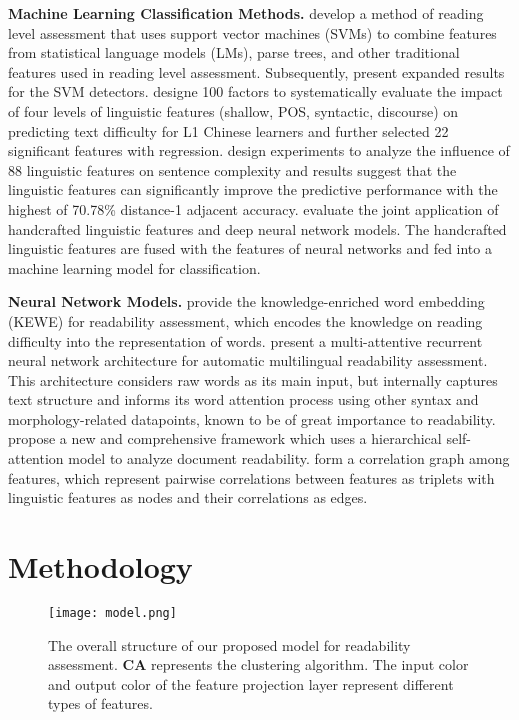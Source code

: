 \documentclass[11pt]{article}
\begin{document}
\noindent\textbf{Machine Learning Classification Methods.}
\cite{schwarm2005reading} develop a method of reading level assessment that uses support vector machines (SVMs) to combine features from statistical language models (LMs), parse trees, and other traditional features used in reading level assessment. Subsequently, \cite{petersen2009machine} present expanded results for the SVM detectors.
\cite{qiu2017exploring} designe 100 factors to systematically evaluate the impact of four levels of linguistic features (shallow, POS, syntactic, discourse) on predicting text difficulty for L1 Chinese learners and further selected 22 significant features with regression.
\cite{lu2019sentence} design experiments to analyze the influence of 88 linguistic features on sentence complexity and results suggest that the linguistic features can significantly improve the predictive performance with the highest of 70.78\% distance-1 adjacent accuracy.
\cite{deutsch2020linguistic,lee2021pushing} evaluate the joint application of handcrafted linguistic features and deep neural network models. The handcrafted linguistic features are fused with the features of neural networks and fed into a machine learning model for classification.


\noindent\textbf{Neural Network Models.}
\cite{jiang2018enriching} provide the knowledge-enriched word embedding (KEWE) for readability assessment, which encodes the knowledge on reading difficulty into the representation of words.
\cite{azpiazu2019multiattentive} present a multi-attentive recurrent neural network architecture for automatic multilingual readability assessment. This architecture considers raw words as its main input, but internally captures text structure and informs its word attention process using other syntax and morphology-related datapoints, known to be of great importance to readability.
\cite{meng2020readnet} propose a new and comprehensive framework which uses a hierarchical self-attention model to analyze document readability.
\cite{qiu2021learning} form a correlation graph among features, which represent pairwise correlations between features as triplets with linguistic features as nodes and their correlations as edges. 



\section{Methodology}

\begin{figure*}[htbp]
\centering
\texttt{[image: model.png]}
\caption{The overall structure of our proposed model for readability assessment. \textbf{CA} represents the clustering algorithm. The input color and output color of the feature projection layer represent different types of features.}
\end{figure*}
\end{document}
